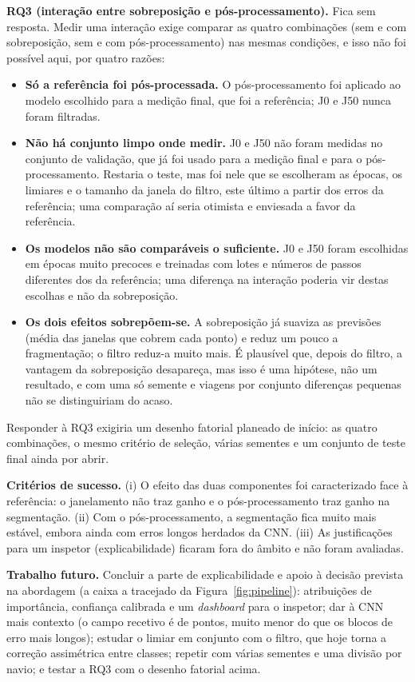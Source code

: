 \documentclass{article}
\newcommand{\revtext}[2]{{\color{#1}#2}}
\begin{document}
{\textbf{RQ3 (interação entre sobreposição e pós-processamento).} Fica sem resposta. Medir uma interação exige comparar as quatro combinações (sem e com sobreposição, sem e com pós-processamento) nas mesmas condições, e isso não foi possível aqui, por quatro razões:
\begin{itemize}
\item \textbf{Só a referência foi pós-processada.} O pós-processamento foi aplicado ao modelo escolhido para a medição final, que foi a referência; J0 e J50 nunca foram filtradas.
\item \textbf{Não há conjunto limpo onde medir.} J0 e J50 não foram medidas no conjunto de validação, que já foi usado para a medição final e para o pós-processamento. Restaria o teste, mas foi nele que se escolheram as épocas, os limiares e o tamanho da janela do filtro, este último a partir dos erros da referência; uma comparação aí seria otimista e enviesada a favor da referência.
\item \textbf{Os modelos não são comparáveis o suficiente.} J0 e J50 foram escolhidas em épocas muito precoces e treinadas com lotes e números de passos diferentes dos da referência; uma diferença na interação poderia vir destas escolhas e não da sobreposição.
\item \textbf{Os dois efeitos sobrepõem-se.} A sobreposição já suaviza as previsões (média das janelas que cobrem cada ponto) e reduz um pouco a fragmentação; o filtro reduz-a muito mais. É plausível que, depois do filtro, a vantagem da sobreposição desapareça, mas isso é uma hipótese, não um resultado, e com uma só semente e \resVaViagens{} viagens por conjunto diferenças pequenas não se distinguiriam do acaso.
\end{itemize}
Responder à RQ3 exigiria um desenho fatorial planeado de início: as quatro combinações, o mesmo critério de seleção, várias sementes e um conjunto de teste final ainda por abrir.

\textbf{Critérios de sucesso.} (i) O efeito das duas componentes foi caracterizado face à referência: o janelamento não traz ganho e o pós-processamento traz ganho na segmentação. (ii) Com o pós-processamento, a segmentação fica muito mais estável, embora ainda com erros longos herdados da CNN. (iii) As justificações para um inspetor (explicabilidade) ficaram fora do âmbito e não foram avaliadas.

\textbf{Trabalho futuro.} \revtext{rev062}{Concluir a parte de explicabilidade e apoio à decisão prevista na abordagem (a caixa a tracejado da Figura~\ref{fig:pipeline}): atribuições de importância, confiança calibrada e um \emph{dashboard} para o inspetor;} dar à CNN mais contexto (o campo recetivo é de \resModCampo{} pontos, muito menor do que os blocos de erro mais longos); estudar o limiar em conjunto com o filtro, que hoje torna a correção assimétrica entre classes; repetir com várias sementes e uma divisão por navio; e testar a RQ3 com o desenho fatorial acima.}
\end{document}
